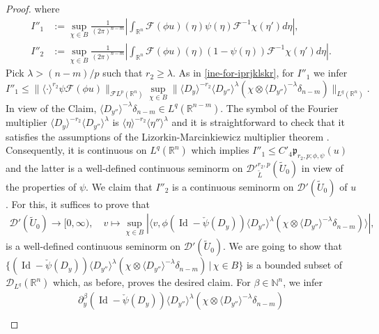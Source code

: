 \documentclass[12pt,reqno]{amsart}
\newcommand{\NN}{\mathbb N}
\newcommand{\RR}{\mathbb R}
\newcommand{\DD}{\mathcal D}
\theoremstyle{plain}
\theoremstyle{remark}
\theoremstyle{definition}
\numberwithin{equation}{section}
\begin{document}
\begin{proof}
where
\begin{align*}
I''_1&:=\sup_{\chi\in B} \frac{1}{(2\pi)^{n-m}}\left|\int_{\RR^n}\mathcal{F}(\phi u)(\eta)\psi(\eta)\mathcal{F}^{-1}\chi(\eta')d\eta\right|,\\
I''_2&:=\sup_{\chi\in B} \frac{1}{(2\pi)^{n-m}}\left|\int_{\RR^n}\mathcal{F}(\phi u)(\eta)(1-\psi(\eta))\mathcal{F}^{-1}\chi(\eta')d\eta\right|.
\end{align*}
Pick $\lambda>(n-m)/p$ such that $r_2\geq \lambda$. As in \eqref{ine-for-iprjklskr}, for $I''_1$ we infer
\begin{equation*}
I''_1\leq \|\langle\cdot\rangle^{r_2}\psi\mathcal{F}(\phi u)\|_{\mathcal{F}L^p(\RR^n)}\sup_{\chi\in B}\|\langle D_y\rangle^{-r_2}\langle D_{y''}\rangle^{\lambda}(\chi\otimes \langle D_{y''}\rangle^{-\lambda}\delta_{n-m})\|_{L^q(\RR^n)}.
\end{equation*}
In view of the Claim, $\langle D_{y''}\rangle^{-\lambda}\delta_{n-m}\in L^q(\RR^{n-m})$. The symbol of the Fourier multiplier $\langle D_y\rangle^{-r_2}\langle D_{y''}\rangle^{\lambda}$ is $\langle \eta\rangle^{-r_2}\langle \eta''\rangle^{\lambda}$ and it is straightforward to check that it satisfies the assumptions of the Lizorkin-Marcinkiewicz multiplier theorem \cite[Corollary 6.2.5, p. 444]{Grafakos}. Consequently, it is continuous on $L^q(\RR^n)$ which implies $I''_1\leq C'_4\mathfrak{p}_{r_2,p;\phi,\psi}(u)$ and the latter is a well-defined continuous seminorm on $\DD'^{r_2,p}_{\widetilde{L}}(\widetilde{U}_0)$ in view of the properties of $\psi$. We claim that $I''_2$ is a continuous seminorm on $\DD'(\widetilde{U}_0)$ of $u$. For this, it suffices to prove that
\begin{align*}
\DD'(\widetilde{U}_0)\rightarrow[0,\infty),\quad v\mapsto\sup_{\chi\in B}|\langle v,\phi(\operatorname{Id}-\check{\psi}(D_y))\langle D_{y''}\rangle^{\lambda}(\chi\otimes\langle D_{y''}\rangle^{-\lambda}\delta_{n-m})\rangle|,
\end{align*}
is a well-defined continuous seminorm on $\DD'(\widetilde{U}_0)$. We are going to show that $\{(\operatorname{Id}-\check{\psi}(D_y))\langle D_{y''}\rangle^{\lambda}(\chi\otimes\langle D_{y''}\rangle^{-\lambda}\delta_{n-m})\,|\, \chi\in B\}$ is a bounded subset of $\DD_{L^q}(\RR^n)$ which, as before, proves the desired claim. For $\beta\in\NN^n$, we infer
\begin{multline*}
\partial^{\beta}_y(\operatorname{Id}-\check{\psi}(D_y))\langle D_{y''}\rangle^{\lambda}(\chi\otimes\langle D_{y''}\rangle^{-\lambda}\delta_{n-m})\\

\end{multline*}
\end{proof}
\end{document}

